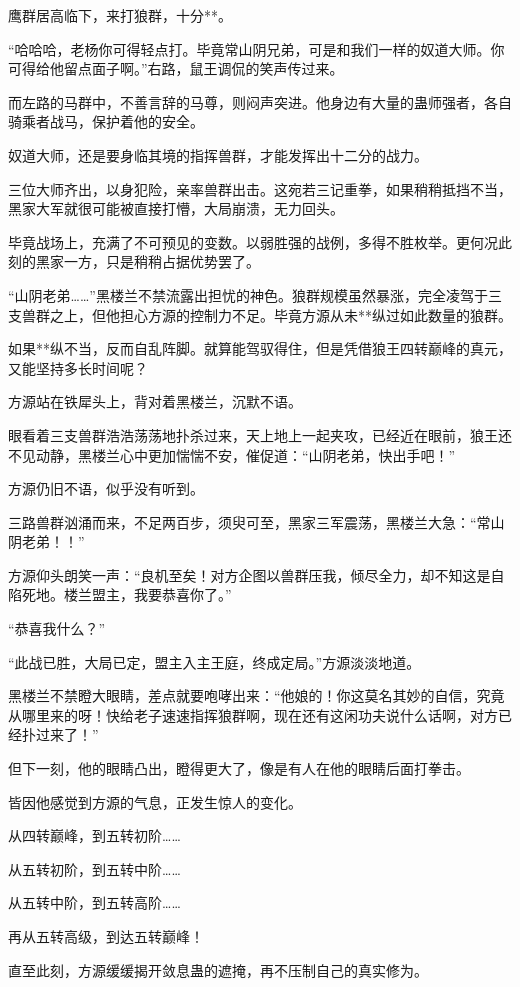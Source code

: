 \begin{this_body}
鹰群居高临下，来打狼群，十分**。

“哈哈哈，老杨你可得轻点打。毕竟常山阴兄弟，可是和我们一样的奴道大师。你可得给他留点面子啊。”右路，鼠王调侃的笑声传过来。

而左路的马群中，不善言辞的马尊，则闷声突进。他身边有大量的蛊师强者，各自骑乘者战马，保护着他的安全。

奴道大师，还是要身临其境的指挥兽群，才能发挥出十二分的战力。

三位大师齐出，以身犯险，亲率兽群出击。这宛若三记重拳，如果稍稍抵挡不当，黑家大军就很可能被直接打懵，大局崩溃，无力回头。

毕竟战场上，充满了不可预见的变数。以弱胜强的战例，多得不胜枚举。更何况此刻的黑家一方，只是稍稍占据优势罢了。

“山阴老弟……”黑楼兰不禁流露出担忧的神色。狼群规模虽然暴涨，完全凌驾于三支兽群之上，但他担心方源的控制力不足。毕竟方源从未**纵过如此数量的狼群。

如果**纵不当，反而自乱阵脚。就算能驾驭得住，但是凭借狼王四转巅峰的真元，又能坚持多长时间呢？

方源站在铁犀头上，背对着黑楼兰，沉默不语。

眼看着三支兽群浩浩荡荡地扑杀过来，天上地上一起夹攻，已经近在眼前，狼王还不见动静，黑楼兰心中更加惴惴不安，催促道：“山阴老弟，快出手吧！”

方源仍旧不语，似乎没有听到。

三路兽群汹涌而来，不足两百步，须臾可至，黑家三军震荡，黑楼兰大急：“常山阴老弟！！”

方源仰头朗笑一声：“良机至矣！对方企图以兽群压我，倾尽全力，却不知这是自陷死地。楼兰盟主，我要恭喜你了。”

“恭喜我什么？”

“此战已胜，大局已定，盟主入主王庭，终成定局。”方源淡淡地道。

黑楼兰不禁瞪大眼睛，差点就要咆哮出来：“他娘的！你这莫名其妙的自信，究竟从哪里来的呀！快给老子速速指挥狼群啊，现在还有这闲功夫说什么话啊，对方已经扑过来了！”

但下一刻，他的眼睛凸出，瞪得更大了，像是有人在他的眼睛后面打拳击。

皆因他感觉到方源的气息，正发生惊人的变化。

从四转巅峰，到五转初阶……

从五转初阶，到五转中阶……

从五转中阶，到五转高阶……

再从五转高级，到达五转巅峰！

直至此刻，方源缓缓揭开敛息蛊的遮掩，再不压制自己的真实修为。


\end{this_body}
